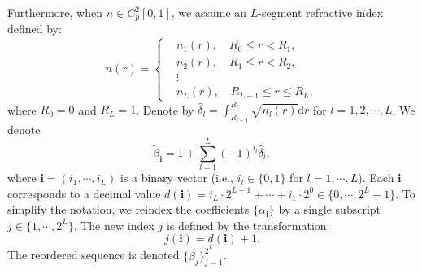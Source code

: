 \documentclass[11pt,reqno]{amsart}
\theoremstyle{definition}
\theoremstyle{remark}
\numberwithin{equation}{section}
\begin{document}
Furthermore, when $n\in C_p^2[0,1]$, we assume an $L$-segment refractive index defined by:
\begin{equation}\label{eq:n_piecewise_C2_def}
	n(r)=\left\{
	\begin{aligned}
		&n_1(r),\quad R_0 \leq r < R_1,\\
		&n_2(r),\quad R_1 \leq r < R_2,\\
		&\vdots\\
		&n_{L}(r),\quad R_{L-1} \leq r \leq R_{L},
	\end{aligned}
	\right.
\end{equation}
where $R_0=0$ and $R_L=1$. Denote by $\hat{\delta}_l=\int_{R_{l-1}}^{R_l}\sqrt{n_{l}(r)}\mathrm{d}r$ for $l=1,2,\cdots,L$. We denote
\begin{equation*}
	\tilde{\beta}_{\mathbf{i}}=1+\sum\limits_{l=1}^{L}(-1)^{i_l}\hat{\delta}_l,
\end{equation*}
where $\mathbf{i} = (i_1, \cdots, i_L)$ is a binary vector (i.e., $i_l \in \{0, 1\}$ for $l = 1, \cdots, L$). Each $\mathbf{i}$ corresponds to a decimal value $d(\mathbf{i}) = i_L \cdot 2^{L-1} + \cdots + i_1 \cdot 2^0 \in \{0, \cdots, 2^L - 1\}$.
To simplify the notation, we reindex the coefficients $\{\alpha_{\mathbf{i}}\}$ by a single subscript $j \in \{1, \cdots, 2^L\}$. The new index $j$ is defined by the transformation:
\begin{equation*}
j(\mathbf{i}) = d(\mathbf{i})+ 1.
\end{equation*}
The reordered sequence is denoted $\{\tilde{\beta}_j\}_{j=1}^{2^L}$.
\end{document}

